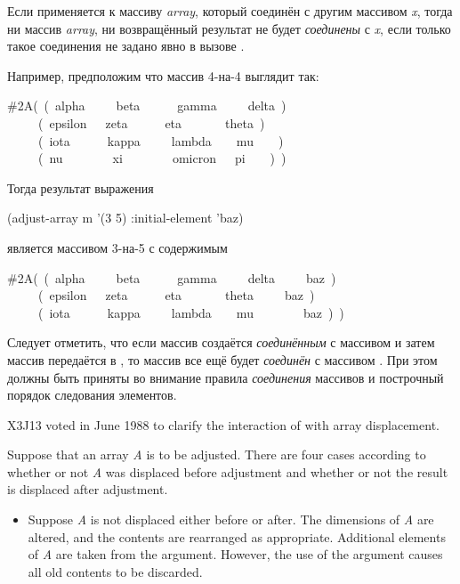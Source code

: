 \begin{defun}[Функция]
Если  применяется к массиву \emph{array}, который соединён с
другим массивом \emph{x}, тогда ни массив \emph{array}, ни возвращённый
результат не будет \emph{соединены} с \emph{x}, если только такое соединения не
задано явно в вызове .

Например, предположим что массив 4-на-4  выглядит так:
\begin{lisp}
\#2A(~(~alpha~~~~~beta~~~~~~gamma~~~~~delta~) \\
~~~~~(~epsilon~~~zeta~~~~~~eta~~~~~~~theta~) \\
~~~~~(~iota~~~~~~kappa~~~~~lambda~~~~mu~~~~) \\
~~~~~(~nu~~~~~~~~xi~~~~~~~~omicron~~~pi~~~~)~)
\end{lisp}
Тогда результат выражения
\begin{lisp}
(adjust-array m '(3 5) :initial-element 'baz)
\end{lisp}
является массивом 3-на-5 с содержимым
\begin{lisp}
\#2A(~(~alpha~~~~~beta~~~~~~gamma~~~~~delta~~~~~baz~) \\
~~~~~(~epsilon~~~zeta~~~~~~eta~~~~~~~theta~~~~~baz~) \\
~~~~~(~iota~~~~~~kappa~~~~~lambda~~~~mu~~~~~~~~baz~)~)
\end{lisp}
Следует отметить, что если массив  создаётся \emph{соединённым} с массивом
 и затем массив  передаётся в , то массив 
все ещё будет \emph{соединён} с массивом . При этом должны быть приняты во
внимание правила \emph{соединения} массивов и построчный порядок следования
элементов.

\begin{newer}
X3J13 voted in June 1988 
to clarify the interaction of  with array displacement.

Suppose that an array \emph{A} is to be adjusted.  There are four cases
according to whether or not \emph{A} was displaced before adjustment
and whether or not the result is displaced after adjustment.
\begin{itemize}
\item
Suppose \emph{A} is not displaced either before or after.
The dimensions of \emph{A} are altered, and
the contents are rearranged as appropriate.  Additional elements of \emph{A}
are taken from the  argument.
However, the use of the  argument causes all old
contents to be discarded.


\end{itemize}
\end{newer}
\end{defun}
